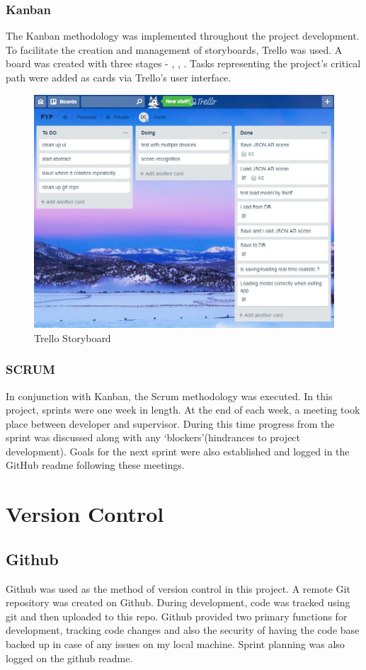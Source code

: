 \subsubsection{Kanban}
The Kanban methodology was implemented throughout the project development. To facilitate the creation and management of storyboards, Trello was used. A board was created with three stages - , , . Tasks representing the project’s critical path were added as cards via Trello’s user interface.

\begin{figure}[!ht]
\caption{Trello Storyboard}
\centering
\includegraphics[width=1\textwidth]{images/trello.JPG}
\end{figure}

\subsubsection{SCRUM}
In conjunction with Kanban, the Scrum methodology was executed. In this project, sprints were one week in length. At the end of each week, a meeting took place between developer and supervisor. During this time progress from the sprint was discussed along with any ‘blockers’(hindrances to project development). Goals for the next sprint were also established and logged in the GitHub readme following these meetings. 


\section{Version Control}
\subsection{Github}
Github was used as the method of version control in this project. A remote Git repository was created on Github. During development, code was tracked using git and then uploaded to this repo. Github provided two primary functions for development, tracking code changes and also the security of having the code base backed up in case of any issues on my local machine. Sprint planning was also logged on the github readme.  


